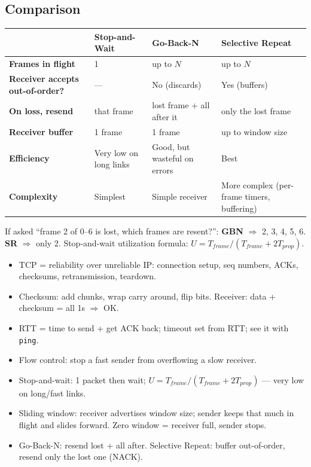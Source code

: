 \subsection{Comparison}
\begin{center}
\begin{tabularx}{\textwidth}{>{\bfseries}l X X X}
\toprule
 & Stop-and-Wait & Go-Back-N & Selective Repeat \\
\midrule
Frames in flight & 1 & up to $N$ & up to $N$ \\
Receiver accepts out-of-order? & --- & No (discards) & Yes (buffers) \\
On loss, resend & that frame & lost frame + all after it & only the lost frame \\
Receiver buffer & 1 frame & 1 frame & up to window size \\
Efficiency & Very low on long links & Good, but wasteful on errors & Best \\
Complexity & Simplest & Simple receiver & More complex (per-frame timers, buffering) \\
\bottomrule
\end{tabularx}
\end{center}

\begin{examtip}
If asked ``frame 2 of 0--6 is lost, which frames are resent?'': \textbf{GBN} $\Rightarrow$ 2, 3, 4, 5, 6. \textbf{SR} $\Rightarrow$ only 2. Stop-and-wait utilization formula: $U = T_{frame}/(T_{frame}+2T_{prop})$.
\end{examtip}

\begin{recap}
\begin{itemize}
  \item TCP = reliability over unreliable IP: connection setup, seq numbers, ACKs, checksums, retransmission, teardown.
  \item Checksum: add chunks, wrap carry around, flip bits. Receiver: data + checksum = all 1s $\Rightarrow$ OK.
  \item RTT = time to send + get ACK back; timeout set from RTT; see it with \texttt{ping}.
  \item Flow control: stop a fast sender from overflowing a slow receiver.
  \item Stop-and-wait: 1 packet then wait; $U = T_{frame}/(T_{frame}+2T_{prop})$ --- very low on long/fast links.
  \item Sliding window: receiver advertises window size; sender keeps that much in flight and slides forward. Zero window = receiver full, sender stops.
  \item Go-Back-N: resend lost + all after. Selective Repeat: buffer out-of-order, resend only the lost one (NACK).
\end{itemize}
\end{recap}
